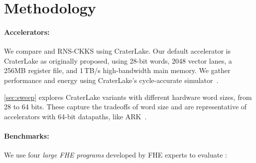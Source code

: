 \section{Methodology}
\label{sec:methodology}

\paragraph{Accelerators:}
We compare \name and RNS-CKKS using CraterLake.
Our default accelerator is CraterLake as originally proposed, using 28-bit words,
2048 vector lanes, a 256MB register file, and 1\,TB/s high-bandwidth main memory.
We gather performance and energy using CraterLake's cycle-accurate
simulator~\cite{samardzic:isca22:craterlake}.

\autoref{sec:sweep} explores CraterLake variants with different hardware word
sizes, from 28 to 64 bits.
These capture the tradeoffs of word size and are representative
of accelerators with 64-bit datapaths, like ARK~\cite{kim2022ark}.


%

\paragraph{Benchmarks:}
We use four \emph{large FHE programs} developed by FHE
experts to evaluate \name:


